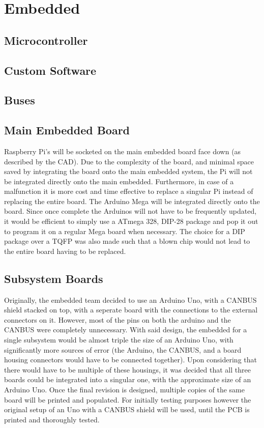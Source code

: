 \documentclass[main.tex]{subfiles}
\begin{document}
    \section{Embedded}
    \subsection{Microcontroller}
    \subsection{Custom Software}
    \subsection{Buses}
    \subsection{Main Embedded Board}
    Raspberry Pi’s will be socketed on the main embedded board face down (as described by the CAD). Due to the complexity of the board, and minimal space saved by integrating the board onto the main embedded system, the Pi will not be integrated directly onto the main embedded. Furthermore, in case of a malfunction it is more cost and time effective to replace a singular Pi instead of replacing the entire board. The Arduino Mega will be integrated directly onto the board. Since once complete the Arduinos will not have to be frequently updated, it would be efficient to simply use a ATmega 328, DIP-28 package and pop it out to program it on a regular Mega board when necessary. The choice for a DIP package over a TQFP was also made such that a blown chip would not lead to the entire board having to be replaced.

    \subsection{Subsystem Boards}
    Originally, the embedded team decided to use an Arduino Uno, with a CANBUS shield stacked on top, with a seperate board with the connections to the external connectors on it. However, most of the pins on both the arduino and the CANBUS were completely unnecessary. With said design, the embedded for a single subsystem would be almost triple the size of an Arduino Uno, with significantly more sources of error (the Arduino, the CANBUS, and a board housing connectors would have to be connected together).  Upon considering that there would have to be multiple of these housings, it was decided that all three boards could be integrated into a singular one, with the approximate size of an Arduino Uno. Once the final revision is designed, multiple copies of the same board will be printed and populated. For initially testing purposes however the original setup of an Uno with a CANBUS shield will be used, until the PCB is printed and thoroughly tested.
\end{document}
